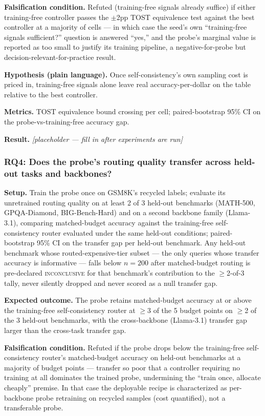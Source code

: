 \documentclass[11pt]{article}
\newcommand{\ph}{\textit{[placeholder --- fill in after experiments are run]}}
\begin{document}
\textbf{Falsification condition.} Refuted (training-free signals already suffice) if either training-free controller passes the $\pm$2pp TOST equivalence test against the best controller at a majority of cells --- in which case the seed's own ``training-free signals sufficient?'' question is answered ``yes,'' and the probe's marginal value is reported as too small to justify its training pipeline, a negative-for-probe but decision-relevant-for-practice result.

\textbf{Hypothesis (plain language).} Once self-consistency's own sampling cost is priced in, training-free signals alone leave real accuracy-per-dollar on the table relative to the best controller.

\textbf{Metrics.} TOST equivalence bound crossing per cell; paired-bootstrap 95\% CI on the probe-vs-training-free accuracy gap.

\textbf{Result.} \ph

\subsubsection{RQ4: Does the probe's routing quality transfer across held-out tasks and backbones?}
\textbf{Setup.} Train the probe once on GSM8K's recycled labels; evaluate its unretrained routing quality on at least 2 of 3 held-out benchmarks (MATH-500, GPQA-Diamond, BIG-Bench-Hard) and on a second backbone family (Llama-3.1), comparing matched-budget accuracy against the training-free self-consistency router evaluated under the same held-out conditions; paired-bootstrap 95\% CI on the transfer gap per held-out benchmark. Any held-out benchmark whose routed-expensive-tier subset --- the only queries whose transfer accuracy is informative --- falls below $n{=}200$ after matched-budget routing is pre-declared \textsc{inconclusive} for that benchmark's contribution to the $\geq$2-of-3 tally, never silently dropped and never scored as a null transfer gap.

\textbf{Expected outcome.} The probe retains matched-budget accuracy at or above the training-free self-consistency router at $\geq$3 of the 5 budget points on $\geq$2 of the 3 held-out benchmarks, with the cross-backbone (Llama-3.1) transfer gap larger than the cross-task transfer gap.

\textbf{Falsification condition.} Refuted if the probe drops below the training-free self-consistency router's matched-budget accuracy on held-out benchmarks at a majority of budget points --- transfer so poor that a controller requiring no training at all dominates the trained probe, undermining the ``train once, allocate cheaply'' premise. In that case the deployable recipe is characterized as per-backbone probe retraining on recycled samples (cost quantified), not a transferable probe.
\end{document}
